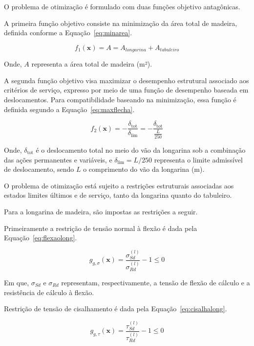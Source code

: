 O problema de otimização é formulado com duas funções objetivo antagônicas.

A primeira função objetivo consiste na minimização da área total de madeira, definida conforme a Equação~\eqref{eq:minarea}.

\begin{equation}
f_1(\mathbf{x}) = A = A_{longarina} + A_{tabuleiro}
\label{eq:minarea}
\end{equation}

Onde, $A$ representa a área total de madeira (m²).

A segunda função objetivo visa maximizar o desempenho estrutural associado aos critérios de serviço, expresso por meio de uma função de desempenho baseada em deslocamentos. Para compatibilidade baseando na minimização, essa função é definida segundo a Equação~\eqref{eq:maxflecha}.

\begin{equation}
f_2(\mathbf{x}) = - \frac{\delta_{\mathrm{tot}}}{\delta_{\mathrm{lim}}} = - \frac{\delta_{\mathrm{tot}}}{\frac{L}{250}}
\label{eq:maxflecha}
\end{equation}

Onde, $\delta_{\mathrm{tot}}$ é o deslocamento total no meio do vão da longarina sob a combinação das ações permanentes e variáveis, e $\delta_{\mathrm{lim}} = L/250$ representa o limite admissível de deslocamento, sendo $L$ o comprimento do vão da longarina (m).

O problema de otimização está sujeito a restrições estruturais associadas aos estados limites últimos e de serviço, tanto da longarina quanto do tabuleiro.

Para a longarina de madeira, são impostas as restrições a seguir.

Primeiramente a restrição de tensão normal à flexão é dada pela Equação~\eqref{eq:flexaolong}.

\begin{equation}
g_{g,\sigma}(\mathbf{x}) =
\frac{\sigma_{Sd}^{(l)}}{\sigma_{Rd}^{(l)}} - 1\leq 0
\label{eq:flexaolong}
\end{equation}

Em que, $\sigma_{Sd}$ e $\sigma_{Rd}$ representam, respectivamente, a tensão de flexão de cálculo e a resistência de cálculo à flexão.

Restrição de tensão de cisalhamento é dada pela Equação~\eqref{eq:cisalhalong}.
    
\begin{equation}
g_{g,\tau}(\mathbf{x}) =
\frac{\tau_{Sd}^{(l)}}{\tau_{Rd}^{(l)}} - 1 \leq 0
\label{eq:cisalhalong}
\end{equation}
    
